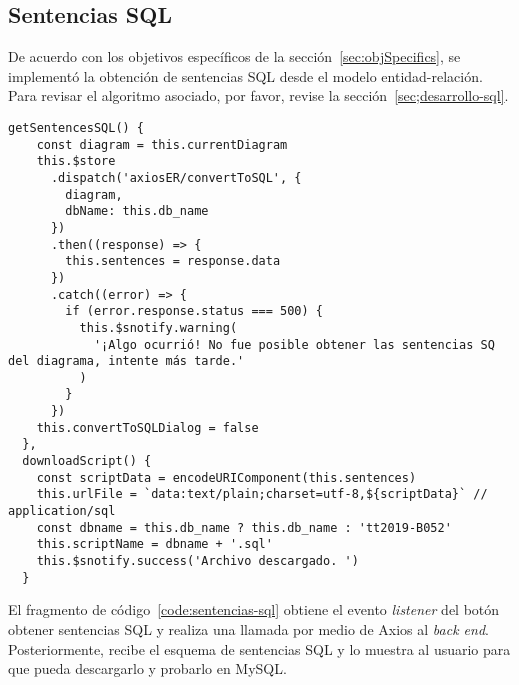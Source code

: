\subsection{Sentencias SQL}
De acuerdo con los objetivos específicos de la sección~\ref{sec:objSpecifics}, se implementó la obtención de sentencias SQL desde el modelo entidad-relación. Para revisar el algoritmo asociado, por favor, revise la sección~\ref{sec;desarrollo-sql}. 
\begin{code}
    \label{code:sentencias-sql}
    \begin{verbatim}
getSentencesSQL() {
    const diagram = this.currentDiagram
    this.$store
      .dispatch('axiosER/convertToSQL', {
        diagram,
        dbName: this.db_name
      })
      .then((response) => {
        this.sentences = response.data
      })
      .catch((error) => {
        if (error.response.status === 500) {
          this.$snotify.warning(
            '¡Algo ocurrió! No fue posible obtener las sentencias SQ del diagrama, intente más tarde.'
          )
        }
      })
    this.convertToSQLDialog = false
  },
  downloadScript() {
    const scriptData = encodeURIComponent(this.sentences)
    this.urlFile = `data:text/plain;charset=utf-8,${scriptData}` // application/sql
    const dbname = this.db_name ? this.db_name : 'tt2019-B052'
    this.scriptName = dbname + '.sql'
    this.$snotify.success('Archivo descargado. ')
  }

\end{verbatim}
\end{code}


El fragmento de código~\ref{code:sentencias-sql} obtiene el evento \textit{listener} del botón obtener sentencias SQL y realiza una llamada por medio de Axios al \textit{back end}. Posteriormente, recibe el esquema de sentencias SQL y lo muestra al usuario para que pueda descargarlo y probarlo en MySQL.